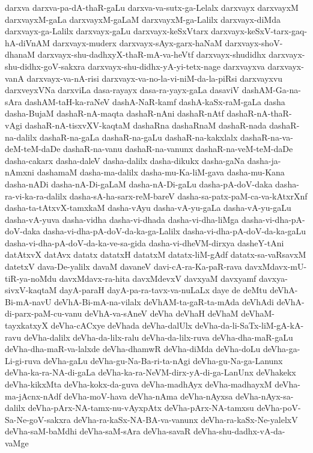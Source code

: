 {darxva
darxva-pa-dA-thaR-gaLu
darxva-va-sutx-ga-Lelalx
darxvayx
darxvayxM
darxvayxM-gaLa
darxvayxM-gaLaM
darxvayxM-ga-Lalilx
darxvayx-diMda
darxvayx-ga-Lalilx
darxvayx-gaLu
darxvayx-keSxVtarx
darxvayx-keSxV-tarx-gaq-hA-diVnAM
darxvayx-muderx
darxvayx-sAyx-garx-haNaM
darxvayx-shoV-dhanaM
darxvayx-shu-dadhxyX-thaR-mA-va-heVtf
darxvayx-shudidhx
darxvayx-shu-didhx-goV-sakxra
darxvayx-shu-didhx-yA-yi-tetx-nage
darxvayxva
darxvayx-vanA
darxvayx-va-nA-risi
darxvayx-va-no-la-vi-niM-da-la-piRsi
darxvayxvu
darxveyxVNa
darxviLa
dasa-rayayx
dasa-ra-yayx-gaLa
dasaviV
dashAM-Ga-na-sAra
dashAM-taH-ka-raNeV
dashA-NaR-kamf
dashA-kaSx-raM-gaLa
dasha
dasha-BujaM
dashaR-nA-maqta
dashaR-nAni
dashaR-nAtf
dashaR-nA-thaR-vAgi
dashaR-nA-tisxvXV-kaqtaM
dashaRna
dashaRnaM
dashaR-nada
dashaR-na-dalilx
dashaR-na-gaLa
dashaR-na-gaLu
dashaR-na-kakxlalx
dashaR-na-va-deM-teM-daDe
dashaR-na-vanu
dashaR-na-vanunx
dashaR-na-veM-teM-daDe
dasha-cakarx
dasha-daleV
dasha-dalilx
dasha-dikukx
dasha-gaNa
dasha-ja-nAmxni
dashamaM
dasha-ma-dalilx
dasha-mu-Ka-liM-gava
dasha-mu-Kana
dasha-nADi
dasha-nA-Di-gaLaM
dasha-nA-Di-gaLu
dasha-pA-doV-daka
dasha-ra-vi-ka-ra-dalilx
dasha-sA-ha-sarx-reM-bareV
dasha-sa-patx-paM-ca-va-kAtxrXnf
dasha-ta-tAtxvX-tamxkaM
dasha-vAyu
dasha-vA-yu-gaLa
dasha-vA-yu-gaLu
dasha-vA-yuva
dasha-vidha
dasha-vi-dhada
dasha-vi-dha-liMga
dasha-vi-dha-pA-doV-daka
dasha-vi-dha-pA-doV-da-ka-ga-Lalilx
dasha-vi-dha-pA-doV-da-ka-gaLu
dasha-vi-dha-pA-doV-da-ka-ve-sa-gida
dasha-vi-dheVM-dirxya
dasheY-tAni
datAtxvX
datAvx
datatx
datatxH
datatxM
datatx-liM-gAdf
datatx-sa-vaRsavxM
datetxV
dava-De-yalilx
davaM
davaneV
davi-cA-ra-Ka-paR-rava
davxMdavx-mU-tiR-ya-noMdu
davxMdavx-ra-hita
davxMdevxV
davxyaM
davxyamf
davxya-sivxV-kaqtaM
dayA-paraH
dayA-pa-ra-tavx-va-nuLaLx
daye
de
deMtu
deVhA-Bi-mA-navU
deVhA-Bi-mA-na-vilalx
deVhAM-ta-gaR-ta-mAda
deVhAdi
deVhA-di-parx-paM-cu-vanu
deVhA-va-sAneV
deVha
deVhaH
deVhaM
deVhaM-tayxkatxyX
deVha-cACxye
deVhada
deVha-dalUlx
deVha-da-li-SaTx-liM-gA-kA-ravu
deVha-dalilx
deVha-da-lilx-ralu
deVha-da-lilx-ruva
deVha-dha-maR-gaLu
deVha-dha-maR-va-lalxde
deVha-dhamwR
deVha-diMda
deVha-doLu
deVha-ga-Li-gi-ruva
deVha-gaLu
deVha-gu-Na-Ba-ri-ta-nAgi
deVha-gu-Na-ga-Lanunx
deVha-ka-ra-NA-di-gaLa
deVha-ka-ra-NeVM-dirx-yA-di-ga-LanUnx
deVhakekx
deVha-kikxMta
deVha-kokx-da-guva
deVha-madhAyx
deVha-madhayxM
deVha-ma-jAcnx-nAdf
deVha-moV-hava
deVha-nAma
deVha-nAyxsa
deVha-nAyx-sa-dalilx
deVha-pArx-NA-tamx-nu-vAyxpAtx
deVha-pArx-NA-tamxsu
deVha-poV-Sa-Ne-goV-sakxra
deVha-ra-kaSx-NA-BA-va-vanunx
deVha-ra-kaSx-Ne-yalelxV
deVha-saM-baMdhi
deVha-saM-sAra
deVha-savaR
deVha-shu-dadhx-vA-da-vaMge
}
